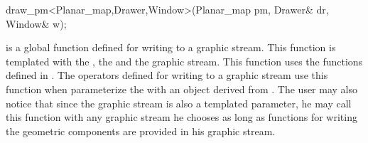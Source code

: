 
\ccRefPageBegin


\begin{ccRefFunction}{draw_pm<Planar_map,Drawer,Window>(Planar_map pm, Drawer& dr, Window& w);}
    

\ccDefinition
{} is a global function defined for writing  to a graphic stream. 
This function is templated with the , the  and the graphic stream.  
This function uses the functions defined in .
The operators defined for writing  to a graphic stream use this 
function when parameterize the  with an object derived from 
. 
The user may also notice that since the graphic stream is also 
a templated parameter, he may call this function with any graphic 
stream he chooses as long as functions for writing the geometric 
components are provided in his graphic stream.

\end{ccRefFunction} %

\ccRefPageEnd











